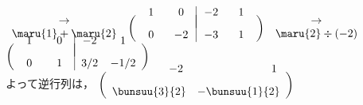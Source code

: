 \documentclass[a4paper,10pt,onecolumn,oneside,notitlepage,final]{jsarticle} %
\begin{document}
$\begin{array}{ll}
\hfill\to\hfill\\
\maru{1}+\maru{2}\\
\end{array}$
$\left(\begin{array}{cc|cc}
\hspace{6mm}&\hspace{6mm}&\hspace{6mm}&\hspace{6mm}\\[-7mm]
   1&   0&  -2&   1\\[3mm]
   0&  -2&  -3&   1\\
\end{array}\right)$
$\begin{array}{ll}
\hfill\to\hfill\\
\maru{2}\div(-2)\\
\end{array}$
$\left(\begin{array}{cc|cc}
\hspace{6mm}&\hspace{6mm}&\hspace{6mm}&\hspace{6mm}\\[-7mm]
   1&   0&  -2&   1\\[3mm]
   0&   1& 3/2&-1/2\\
\end{array}\right)$\\

よって逆行列は，
$\left(\begin{array}{rr}
\hspace{6mm}&\hspace{6mm}\\[-7mm]
  -2\;&   1\;\\[3mm]
\bunsuu{3}{2}&-\bunsuu{1}{2}\\
\end{array}\right)$

\newpage
\end{document}
